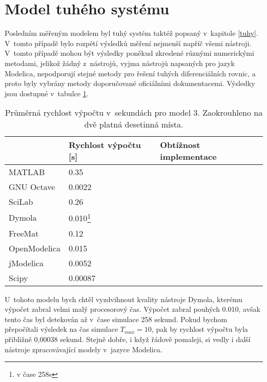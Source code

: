 \section{Model tuhého systému}
\label{srovnani-tuhy}
Posledním měřeným modelem byl tuhý systém taktéž popsaný v~kapitole \ref{tuhy}. V~tomto případě bylo rozpětí výsledků měření nejmenší napříč všemi nástroji. V~tomto případě mohou být výsledky poněkud zkreslené různými numerickými metodami, jelikož žádný z~nástrojů, vyjma nástrojů napsaných pro jazyk Modelica, nepodporují stejné metody pro řešení tuhých diferenciálních rovnic, a proto byly vybrány metody doporučované oficiálními dokumentacemi. Výsledky jsou dostupné v~tabulce \ref{tab:tuhy-tabulka}.
\begin{savenotes}
\begin{table}[ht]
\centering
\begin{tabular}{|l|l|l|}
\hline
             & Rychlost výpočtu {[}s{]} & Obtížnost implementace \\ \hline
MATLAB       &         0.35                 &  \\ \hline
GNU Octave   &             0.0022             &  \\ \hline
SciLab       &          0.26                &  \\ \hline
Dymola       &        0.010\footnote{v čase 258s}                  &  \\ \hline
FreeMat &             0.12         &  \\ \hline
OpenModelica    &     0.015                     &  \\ \hline
jModelica        &    0.0052                      &  \\ \hline
 Scipy            &      0.00087                    &  \\ \hline
\end{tabular}
\caption{Průměrná rychlost výpočtu v~sekundách pro model 3. Zaokrouhleno na dvě platná desetinná místa.}
\label{tab:tuhy-tabulka}
\end{table}
\end{savenotes}

U~tohoto modelu bych chtěl vyzdvihnout kvality nástroje Dymola, kterému výpočet zabral velmi malý procesorový čas. Výpočet zabral pouhých 0.010, avšak tento čas byl detekován až v~čase simulace 258 sekund. Pokud bychom přepočítali výsledek na čas simulace $T_{max} = 10$, pak by rychlost výpočtu byla přibližně 0,00038 sekund. Stejně dobře, i když řádově pomaleji, si vedly i další nástroje zpracovávající modely v~jazyce Modelica.

